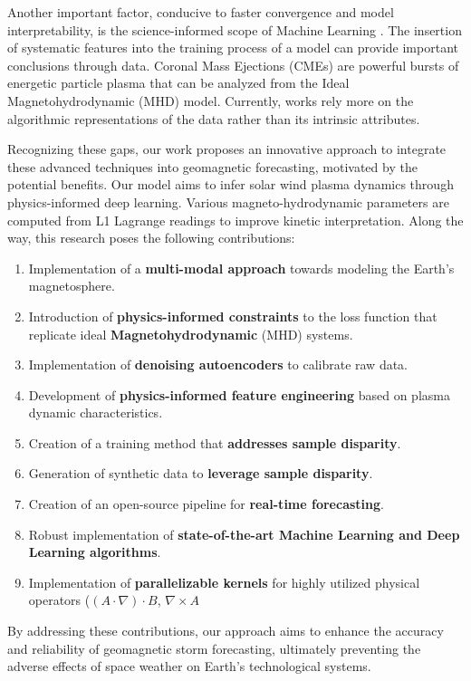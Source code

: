 \documentclass{article}
\begin{document}
Another important factor, conducive to faster convergence and model interpretability, is the science-informed scope of Machine Learning \cite{datadrivenscience}. The insertion of systematic features into the training process of a model can provide important conclusions through data. Coronal Mass Ejections (CMEs) are powerful bursts of energetic particle plasma that can be analyzed from the Ideal Magnetohydrodynamic (MHD) model. Currently, works rely more on the algorithmic representations of the data rather than its intrinsic attributes.

Recognizing these gaps, our work proposes an innovative approach to integrate these advanced techniques into geomagnetic forecasting, motivated by the potential benefits. Our model aims to infer solar wind plasma dynamics through physics-informed deep learning. Various magneto-hydrodynamic parameters are computed from L1 Lagrange readings to improve kinetic interpretation. Along the way, this research poses the following contributions:

\begin{enumerate}
\item Implementation of a \textbf{multi-modal approach} towards modeling the Earth's magnetosphere.
\item Introduction of \textbf{physics-informed constraints} to the loss function that replicate ideal \textbf{Magnetohydrodynamic} (MHD) systems.
\item Implementation of \textbf{denoising autoencoders} to calibrate raw data.
\item Development of \textbf{physics-informed feature engineering} based on plasma dynamic characteristics.
\item Creation of a training method that \textbf{addresses sample disparity}.
\item Generation of synthetic data to \textbf{leverage sample disparity}.
\item Creation of an open-source pipeline for \textbf{real-time forecasting}.
\item Robust implementation of \textbf{state-of-the-art Machine Learning and Deep Learning algorithms}.
\item Implementation of \textbf{parallelizable kernels} for highly utilized physical operators ($(A \cdot \nabla) \cdot B$, $\nabla \times A$
\end{enumerate}

By addressing these contributions, our approach aims to enhance the accuracy and reliability of geomagnetic storm forecasting, ultimately preventing the adverse effects of space weather on Earth's technological systems.
\end{document}
